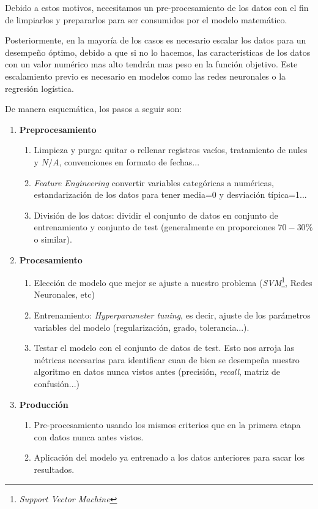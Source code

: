 Debido a estos motivos, necesitamos un pre-procesamiento de los datos con el fin de limpiarlos y 
prepararlos para ser consumidos por el modelo matemático.

Posteriormente, en la mayoría de los casos es necesario escalar los datos para un desempeño óptimo, 
debido a que si no lo hacemos, las características de los datos con un valor numérico mas alto 
tendrán mas peso en la función objetivo. Este escalamiento previo es necesario en modelos como 
las redes neuronales o la regresión logística.

\clearpage

\noindent De manera esquemática, los pasos a seguir son:
\begin{framed}
\begin{enumerate}
  \item \textbf{Preprocesamiento}
  \begin{enumerate}
    \item Limpieza y purga: quitar o rellenar registros vacíos, tratamiento de nules 
          y $N/A$, convenciones en formato de fechas...
    \item \textit{Feature Engineering} convertir variables categóricas a numéricas, 
          estandarización de los datos para tener media=0 y desviación típica=1...
    \item División de los datos: dividir el conjunto de datos en conjunto de entrenamiento y 
          conjunto de test (generalmente en proporciones $70 - 30\%$ o similar).
  \end{enumerate}
  
  \item \textbf{Procesamiento}
  \begin{enumerate}
    \item Elección de modelo que mejor se ajuste a nuestro problema 
          (\textit{SVM}\footnote{\textit{Support Vector Machine}}, Redes Neuronales, etc)
    \item Entrenamiento: \textit{Hyperparameter tuning}, 
          es decir, ajuste de los parámetros variables del modelo (regularización, grado, tolerancia...).
    \item Testar el modelo con el conjunto de datos de test. Esto nos arroja las métricas necesarias
    para identificar cuan de bien se desempeña nuestro algoritmo en datos nunca vistos antes 
    (precisión, \textit{recall}, matriz de confusión...)
  \end{enumerate}
  
  \item \textbf{Producción}
  \begin{enumerate}
    \item Pre-procesamiento usando los mismos criterios que en la primera etapa con datos nunca 
          antes vistos.
    \item Aplicación del modelo ya entrenado a los datos anteriores para sacar los resultados.
  \end{enumerate}
\end{enumerate}
\end{framed}

